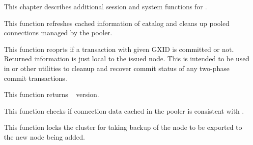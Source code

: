 %
%
  This chapter describes additional session and system functions for \XC.
  
  
      This function refreshes cached information of  catalog and cleans up
	  pooled connections managed by the pooler.
  
  
      This function reoprts if a transaction with given GXID is committed or not.
      Returned information is just local to the issued node.
      This is intended to be used in  or other utilities to cleanup and
	  recover commit status of any two-phase commit transactions.
  
  
      This function returns \XC~ version.
  
  
      This function checks if connection data cached in the pooler is consistent
	  with .
  
  
      This function locks the cluster for taking backup of the node to be exported to the new
	  node being added.
